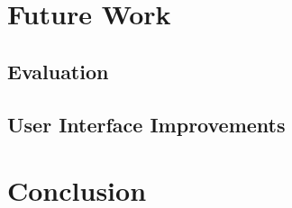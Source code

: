 \chapter{Future Work}
\label{future_work}

\section{Evaluation}
\section{User Interface Improvements}

\chapter{Conclusion}
